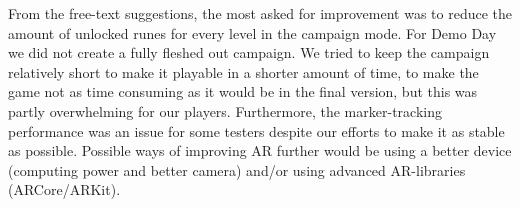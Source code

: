From the free-text suggestions, the most asked for improvement was to reduce the amount of unlocked runes for every level in the campaign mode. For Demo Day we did not create a fully fleshed out campaign. We tried to keep the campaign relatively short to make it playable in a shorter amount of time, to make the game not as time consuming as it would be in the final version, but this was partly overwhelming for our players.
Furthermore, the marker-tracking performance was an issue for some testers despite our efforts to make it as stable as possible. Possible ways of improving AR further would be using a better device (computing power and better camera) and/or using advanced AR-libraries (ARCore/ARKit).

